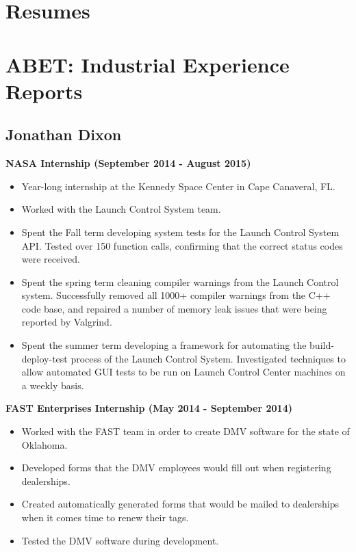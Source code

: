 

\section{Resumes}



	 
     
     
     
          

\section{ABET:  Industrial Experience Reports}

\subsection{Jonathan Dixon}
\large{\textbf{NASA Internship (September 2014 - August 2015)}}
\begin{itemize}
	\item Year-long internship at the Kennedy Space Center in Cape Canaveral, FL.
	\item Worked with the Launch Control System team.
	\item Spent the Fall term developing system tests for the Launch Control System API. Tested over 150 function calls, confirming that the correct status codes were received.
	\item Spent the spring term cleaning compiler warnings from the Launch Control system. Successfully removed all 1000+ compiler warnings from the C++ code base, and repaired a number of memory leak issues that were being reported by Valgrind.
	\item Spent the summer term developing a framework for automating the build-deploy-test process of the Launch Control System. Investigated techniques to allow automated GUI tests to be run on Launch Control Center machines on a weekly basis.
\end{itemize}

\large{\textbf{FAST Enterprises Internship (May 2014 - September 2014)}}
\begin{itemize}
	\item Worked with the FAST team in order to create DMV software for the state of Oklahoma.
	\item Developed forms that the DMV employees would fill out when registering dealerships.
	\item Created automatically generated forms that would be mailed to dealerships when it comes time to renew their tags.
	\item Tested the DMV software during development.
\end{itemize}


